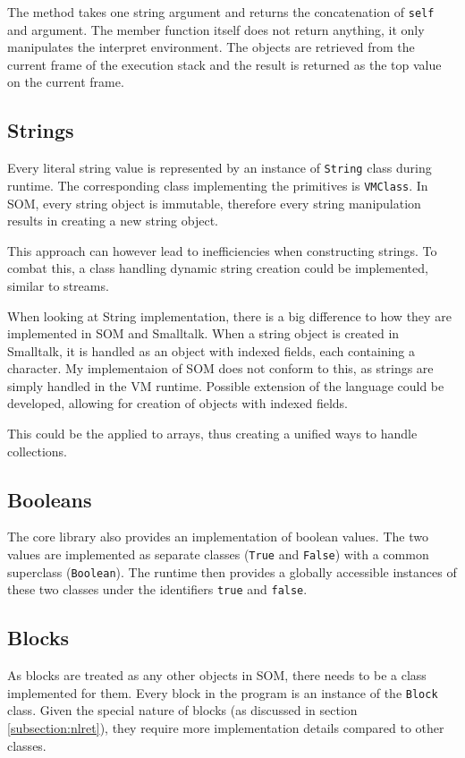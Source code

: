 \documentclass[thesis=M,english]{FITthesis}[2019/12/23]
\begin{document}
The method takes one string argument and returns the concatenation of \texttt{self} and argument. The member function itself does not return anything,
it only manipulates the interpret environment. The objects are retrieved from the current frame of the execution stack and the result is returned
as the top value on the current frame.


\subsection{Strings}
Every literal string value is represented by an instance of \texttt{String} class during runtime. The corresponding class implementing the primitives is
\texttt{VMClass}. In SOM, every string object is immutable, therefore every string manipulation results in creating a new string object.

This approach can however lead to inefficiencies when constructing strings. To combat this, a class handling dynamic string creation could
be implemented, similar to streams.

When looking at String implementation, there is a big difference to how they are implemented in SOM and Smalltalk. When a string object
is created in Smalltalk, it is handled as an object with indexed fields, each containing a character. My implementaion of SOM does not
conform to this, as strings are simply handled in the VM runtime. Possible extension of the language could be developed, allowing for
creation of objects with indexed fields.

This could be the applied to arrays, thus creating a unified ways to handle collections.

\subsection{Booleans}
The core library also provides an implementation of boolean values. The two values are implemented as separate classes (\texttt{True} and \texttt{False})
with a common superclass (\texttt{Boolean}). The runtime then provides a globally accessible instances of these two classes under the identifiers
\texttt{true} and \texttt{false}.

\subsection{Blocks}
As blocks are treated as any other objects in SOM, there needs to be a class implemented for them. Every block in the program is 
an instance of the \texttt{Block} class. Given the special nature of blocks (as discussed in section \ref{subsection:nlret}), they
require more implementation details compared to other classes.
\end{document}
